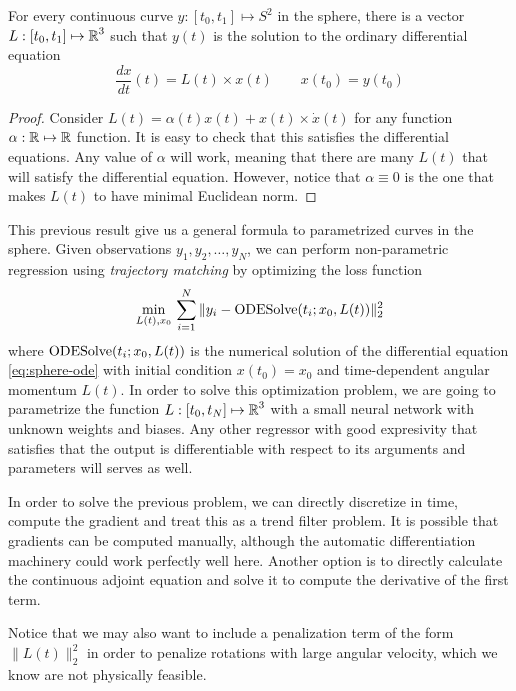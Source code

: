 \begin{lemma}
For every continuous curve $y : [t_0, t_1] \mapsto S^2$ in the sphere, there is a vector $L : [t_0, t_1] \mapsto \operatorname{\mathbb{R}}^3$ such that $y(t)$ is the solution to the ordinary differential equation 
\begin{equation}
    \frac{dx}{dt}(t) = L(t) \times x(t) \qquad x(t_0) = y(t_0)
\end{equation}
\end{lemma}

\begin{proof}
Consider $L(t) = \alpha(t) x(t) + x(t) \times \dot x (t)$ for any function $\alpha : \operatorname{\mathbb{R}} \mapsto \operatorname{\mathbb{R}}$ function. 
It is easy to check that this satisfies the differential equations. 
Any value of $\alpha$ will work, meaning that there are many $L(t)$ that will satisfy the differential equation.
However, notice that $\alpha \equiv 0$ is the one that makes $L(t)$ to have minimal Euclidean norm. 
\end{proof}

This previous result give us a general formula to parametrized curves in the sphere. 
Given observations $y_1, y_2, \ldots, y_N$, we can perform non-parametric regression using \textit{trajectory matching} \cite{ramsay2017dynamic} by optimizing the loss function 
\begin{equation}
 \min_{L(t), x_0} \,
 \sum_{i=1}^N \| y_i - \operatorname{\text{ODESolve}} (t_i ; x_0, L(t)) \|_2^2
\end{equation}
where $\operatorname{\text{ODESolve}} (t_i ; x_0, L(t))$ is the numerical solution of the differential equation \eqref{eq:sphere-ode} with initial condition $x(t_0) = x_0$ and time-dependent angular momentum $L(t)$. 
In order to solve this optimization problem, we are going to parametrize the function $L: [t_0, t_N] \mapsto \operatorname{\mathbb{R}}^3$ with a small neural network with unknown weights and biases. 
Any other regressor with good expresivity that satisfies that the output is differentiable with respect to its arguments and parameters will serves as well. 

In order to solve the previous problem, we can directly discretize in time, compute the gradient and treat this as a trend filter problem. It is possible that gradients can be computed manually, although the automatic differentiation machinery could work perfectly well here.
Another option is to directly calculate the continuous adjoint equation and solve it to compute the derivative of the first term. 

Notice that we may also want to include a penalization term of the form $\| L(t) \|_2^2$ in order to penalize rotations with large angular velocity, which we know are not physically feasible. 


